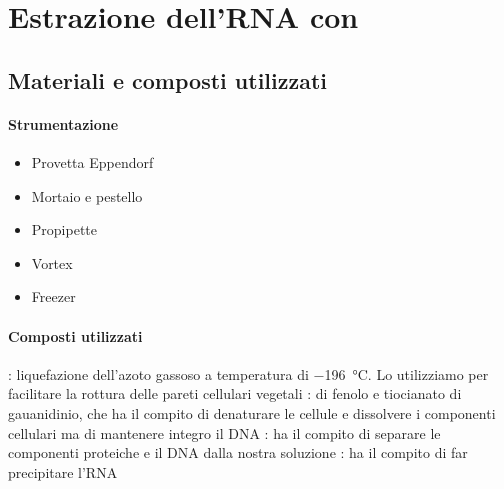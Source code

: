 \section{Estrazione dell'RNA con \trizol}
\subsection{Materiali e composti utilizzati}
\paragraph{Strumentazione}
\begin{itemize}[person]
	\item Provetta \foreignlanguage{german}{Eppendorf}
	\item Mortaio e pestello
	\item Propipette
	\item \foreignlanguage{english}{Vortex}
	\item Freezer
\end{itemize}

\paragraph{Composti utilizzati}

\begingroup
{}
\begin{itemize}[person]
	: liquefazione dell'azoto gassoso a temperatura di \qty{-196}{\celsius}. Lo utilizziamo per facilitare la rottura delle pareti cellulari vegetali
	\itemb[\trizol]: \slz di fenolo e tiocianato di gauanidinio, che ha il compito di denaturare le cellule e dissolvere i componenti cellulari ma di mantenere integro il DNA 
	\itemb[Cloroformio]: ha il compito di separare le componenti proteiche e il DNA dalla nostra soluzione
	\itemb[Isopropanolo]: ha il compito di far precipitare l'RNA
\end{itemize}
\endgroup

